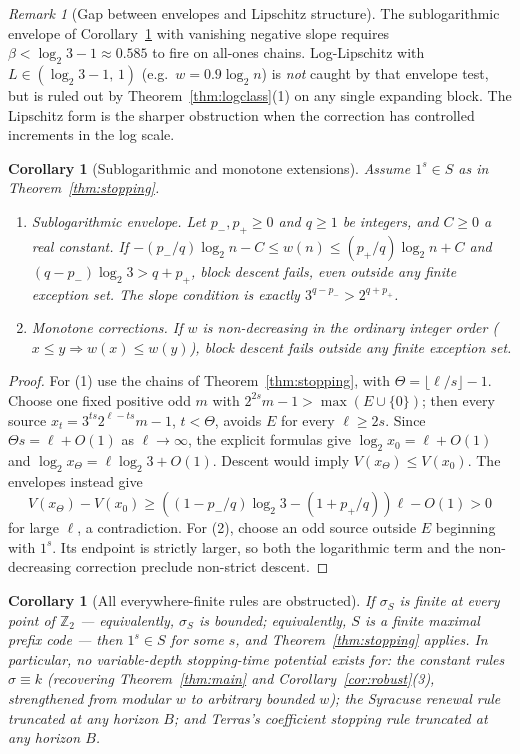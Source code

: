 \documentclass[11pt]{amsart}
\newtheorem{corollary}[theorem]{Corollary}
\theoremstyle{definition}
\theoremstyle{remark}
\newtheorem{remark}[theorem]{Remark}
\newcommand{\Z}{\mathbb{Z}}
\newcommand{\Ztwo}{\Z_2}
\begin{document}
\begin{remark}[Gap between envelopes and Lipschitz structure]\label{rem:gap}
The sublogarithmic envelope of Corollary~\ref{cor:sublogarithmic} with vanishing negative slope requires $\beta < \log_2 3 - 1 \approx 0.585$ to fire on all-ones chains. Log-Lipschitz with $L \in (\log_2 3 - 1,\, 1)$ (e.g.\ $w = 0.9\log_2 n$) is \emph{not} caught by that envelope test, but is ruled out by Theorem~\ref{thm:logclass}(1) on any single expanding block. The Lipschitz form is the sharper obstruction when the correction has controlled increments in the log scale.
\end{remark}

\begin{corollary}[Sublogarithmic and monotone extensions]\label{cor:sublogarithmic}
Assume $1^s\in S$ as in Theorem~\ref{thm:stopping}.
\begin{enumerate}
\item \emph{Sublogarithmic envelope.} Let $p_-,p_+\ge0$ and $q\ge1$ be integers, and $C\ge0$ a real constant. If $-(p_-/q)\log_2 n-C\le w(n)\le(p_+/q)\log_2 n+C$ and $(q-p_-)\log_2 3>q+p_+$, block descent fails, even outside any finite exception set. The slope condition is exactly $3^{q-p_-}>2^{q+p_+}$.
\item \emph{Monotone corrections.} If $w$ is non-decreasing in the ordinary integer order ($x\le y\Rightarrow w(x)\le w(y)$), block descent fails outside any finite exception set.
\end{enumerate}
\end{corollary}
\begin{proof}
For (1) use the chains of Theorem~\ref{thm:stopping}, with $\Theta=\lfloor\ell/s\rfloor-1$. Choose one fixed positive odd $m$ with $2^{2s}m-1>\max(E\cup\{0\})$; then every source $x_t=3^{ts}2^{\ell-ts}m-1$, $t<\Theta$, avoids $E$ for every $\ell\ge2s$. Since $\Theta s=\ell+O(1)$ as $\ell\to\infty$, the explicit formulas give $\log_2 x_0=\ell+O(1)$ and $\log_2 x_\Theta=\ell\log_2 3+O(1)$. Descent would imply $V(x_\Theta)\le V(x_0)$. The envelopes instead give
\[
V(x_\Theta)-V(x_0)\ge
\left((1-p_-/q)\log_2 3-(1+p_+/q)\right)\ell-O(1)>0
\]
for large $\ell$, a contradiction. For (2), choose an odd source outside $E$ beginning with $1^s$. Its endpoint is strictly larger, so both the logarithmic term and the non-decreasing correction preclude non-strict descent.
\end{proof}

\begin{corollary}[All everywhere-finite rules are obstructed]\label{cor:koenig}
If $\sigma_S$ is finite at every point of $\Ztwo$ --- equivalently, $\sigma_S$ is bounded; equivalently, $S$ is a finite maximal prefix code --- then $1^s \in S$ for some $s$, and Theorem~\ref{thm:stopping} applies. In particular, no variable-depth stopping-time potential exists for: the constant rules $\sigma \equiv k$ (recovering Theorem~\ref{thm:main} and Corollary~\ref{cor:robust}(3), strengthened from modular $w$ to arbitrary bounded $w$); the Syracuse renewal rule truncated at any horizon $B$; and Terras's coefficient stopping rule truncated at any horizon $B$.
\end{corollary}
\end{document}
